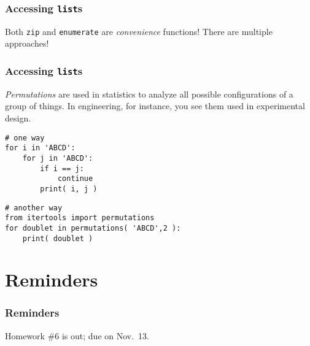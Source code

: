 \documentclass[11pt]{beamer}
\begin{document}
\begin{frame}[fragile]
  \frametitle{Accessing \texttt{list}s}
  \Enlarge

  \begin{enumerate}
  \myitem  Both \texttt{zip} and \texttt{enumerate} are \emph{convenience} functions!
  \myitem  There are multiple approaches!
  \end{enumerate}
\end{frame}

\begin{frame}[fragile]
  \frametitle{Accessing \texttt{list}s}

  \begin{enumerate}
  \myitem  \emph{Permutations} are used in statistics to analyze all possible configurations of a group of things.
  \myitem  In engineering, for instance, you see them used in experimental design.
  \end{enumerate}
  \begin{Verbatim}
# one way
for i in 'ABCD':
    for j in 'ABCD':
        if i == j:
            continue
        print( i, j )
  \end{Verbatim}
  \pause
  \begin{Verbatim}
# another way
from itertools import permutations
for doublet in permutations( 'ABCD',2 ):
    print( doublet )
  \end{Verbatim}
\end{frame}

\iffalse
\begin{frame}[fragile]
  \frametitle{Homework debugging}
  \Enlarge

  \begin{Verbatim}
# how to figure out what directory Python is in
import os
os.getcwd()  # Get Current Working Directory

# how to figure out what's in that directory
os.listdir('.')

# when submitting, use:
open( 'plankton.csv' )  #(since in same dir)
  \end{Verbatim}
\end{frame}

\fi

\section{Reminders}

\begin{frame}
  \frametitle{Reminders}
  \Enlarge

  \begin{itemize}
  \myitem  Homework \#6 is out; due on Nov.\ 13.
  \end{itemize}
\end{frame}
\end{document}
